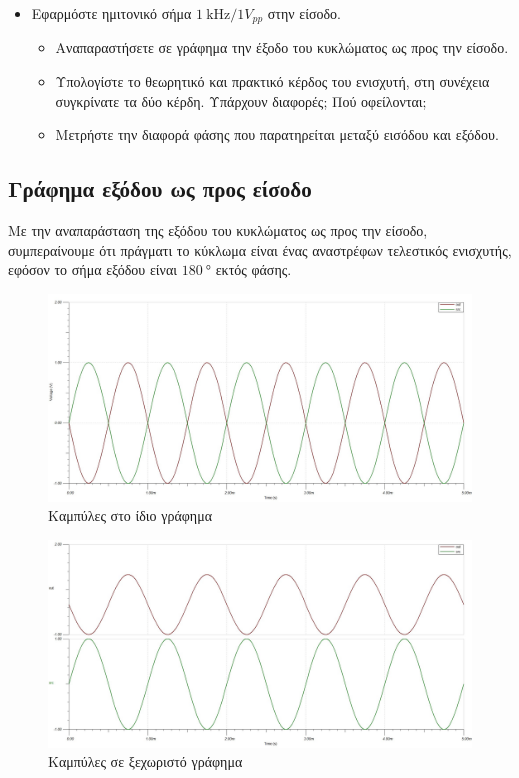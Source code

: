 \documentclass[12pt]{article}
\begin{document}
\begin{itemize}
	\item Εφαρμόστε ημιτονικό σήμα $\SI{1}{\kilo\hertz}/1V_{pp}$ στην είσοδο.
	\begin{itemize}
		\item Αναπαραστήσετε σε γράφημα την έξοδο του κυκλώματος ως
			προς την είσοδο.
		\item Υπολογίστε το θεωρητικό και πρακτικό κέρδος του ενισχυτή,
			στη συνέχεια συγκρίνατε τα δύο κέρδη. Υπάρχουν
			διαφορές; Πού οφείλονται;
		\item Μετρήστε την διαφορά φάσης που παρατηρείται μεταξύ
			εισόδου και εξόδου.
	\end{itemize}
\end{itemize}

\subsection{Γράφημα εξόδου ως προς είσοδο}

Με την αναπαράσταση της εξόδου του κυκλώματος ως προς την είσοδο, συμπεραίνουμε
ότι πράγματι το κύκλωμα είναι ένας αναστρέφων τελεστικός ενισχυτής, εφόσον το
σήμα εξόδου είναι $\SI{180}{\degree}$ εκτός φάσης.

\begin{figure}[H]
	\centering
	\includegraphics[width=\linewidth]{./res/out1.jpg}
	\caption{Καμπύλες στο ίδιο γράφημα}
\end{figure}

\begin{figure}[H]
	\centering
	\includegraphics[width=\linewidth]{./res/out2.jpg}
	\caption{Καμπύλες σε ξεχωριστό γράφημα}
\end{figure}
\end{document}
